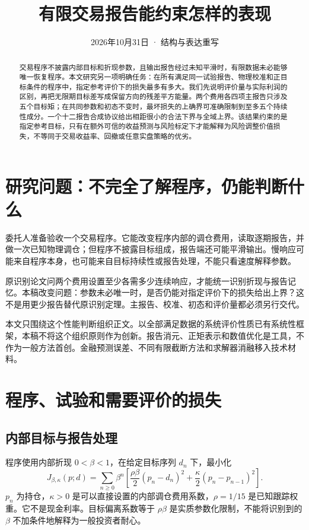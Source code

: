 \documentclass[UTF8,fontset=windows,11pt,a4paper]{ctexart}
\numberwithin{equation}{section}
\begin{document}
\title{有限交易报告能约束怎样的表现}
\author{}\date{2026年10月31日 · 结构与表达重写}
\maketitle
\begin{abstract}
交易程序不披露内部目标和折现参数，且输出报告经过未知平滑时，有限数据未必能够唯一恢复程序。本文研究另一项明确任务：在所有满足同一试验报告、物理校准和正目标条件的程序中，指定参考评价下的损失最多有多大。我们先说明评价量与实际利润的区别，再把无限期目标差写成保留方向的残差平方能量。两个费用各四项主报告只涉及五个目标矩；在共同参数和初态不变时，最坏损失的上确界可准确限制到至多五个持续性成分。一个十二报告合成协议给出相距很小的合法下界与全域上界。该结果约束的是指定参考目标，只有在额外可信的收益预测与风险标定下才能解释为风险调整价值损失，不等同于交易收益率、回撤或任意实盘策略的优劣。
\end{abstract}

\section{研究问题：不完全了解程序，仍能判断什么}
委托人准备验收一个交易程序。它能改变程序内部的调仓费用，读取逐期报告，并做一次已知物理调仓；但程序不披露目标组成，报告端还可能平滑输出。慢响应可能来自程序本身，也可能来自目标持续性或报告处理，不能只看速度解释参数。

原识别论文问两个费用设置至少各需多少连续响应，才能统一识别折现与报告记忆。本稿改变问题：参数未必唯一时，是否仍能对指定评价下的损失给出上界？这不是用更少报告替代原识别定理。主报告、校准、初态和评价量都必须另行交代。

本文只围绕这个性能判断组织正文。以全部满足数据的系统评价性质已有系统性框架\cite{informativity}，本稿不将这个组织原则作为创新。报告消元、正矩表示和数值优化是工具，不作为一般方法首创。金融预测误差、不同有限截断方法和求解器消融移入技术材料。

\section{程序、试验和需要评价的损失}
\subsection{内部目标与报告处理}
程序使用内部折现 $0<\beta<1$，在给定目标序列 $d_n$ 下，最小化
\begin{equation}\label{eq:J}
 J_{\beta,\kappa}(p;d)=\sum_{n\ge0}\beta^n
 \left[\frac{\rho\beta}{2}(p_n-d_n)^2+
 \frac\kappa2(p_n-p_{n-1})^2\right].
\end{equation}
$p_n$ 为持仓，$\kappa>0$ 是可以直接设置的内部调仓费用系数，$\rho=1/15$ 是已知跟踪权重。它不是现金利率。目标偏离系数等于 $\rho\beta$ 是实质参数化限制，不能将识别到的 $\beta$ 不加条件地解释为一般投资者耐心。
\end{document}
